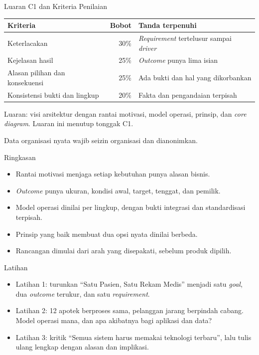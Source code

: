 \documentclass[aspectratio=169, table, 12pt]{beamer}
\begin{document}
\begin{frame}{{\Large Luaran C1 dan Kriteria Penilaian}}
  \footnotesize
  \begin{tabularx}{\textwidth}{>{\raggedright\arraybackslash}p{4.6cm}r
      >{\raggedright\arraybackslash}X}
    \hline
    \textbf{Kriteria} & \textbf{Bobot} & \textbf{Tanda terpenuhi} \\
    \hline
    Keterlacakan & 30\% & \textit{Requirement} tertelusur sampai \textit{driver} \\
    \hline
    Kejelasan hasil & 25\% & \textit{Outcome} punya lima isian \\
    \hline
    Alasan pilihan dan konsekuensi & 25\% & Ada bukti dan hal yang dikorbankan \\
    \hline
    Konsistensi bukti dan lingkup & 20\% & Fakta dan pengandaian terpisah \\
    \hline
  \end{tabularx}

  \vspace{8pt}
  \small Luaran: visi arsitektur dengan rantai motivasi, model operasi, prinsip, dan
  \textit{core diagram}. Luaran ini menutup tonggak C1.

  \vspace{4pt}
  Data organisasi nyata wajib seizin organisasi dan dianonimkan.
\end{frame}

\begin{frame}{{\Large Ringkasan}}
  \vspace{10pt}
  \begin{itemize}
    \item Rantai motivasi menjaga setiap kebutuhan punya alasan bisnis.
    \item \textit{Outcome} punya ukuran, kondisi awal, target, tenggat, dan pemilik.
    \item Model operasi dinilai per lingkup, dengan bukti integrasi dan standardisasi terpisah.
    \item Prinsip yang baik membuat dua opsi nyata dinilai berbeda.
    \item Rancangan dimulai dari arah yang disepakati, sebelum produk dipilih.
  \end{itemize}
\end{frame}

\begin{frame}{{\Large Latihan}}
  \vspace{10pt}
  \begin{itemize}
    \item Latihan 1: turunkan ``Satu Pasien, Satu Rekam Medis'' menjadi satu \textit{goal}, dua
          \textit{outcome} terukur, dan satu \textit{requirement}.
    \item Latihan 2: 12 apotek berproses sama, pelanggan jarang berpindah cabang. Model operasi
          mana, dan apa akibatnya bagi aplikasi dan data?
    \item Latihan 3: kritik ``Semua sistem harus memakai teknologi terbaru'', lalu tulis ulang
          lengkap dengan alasan dan implikasi.
  \end{itemize}
\end{frame}
\end{document}
